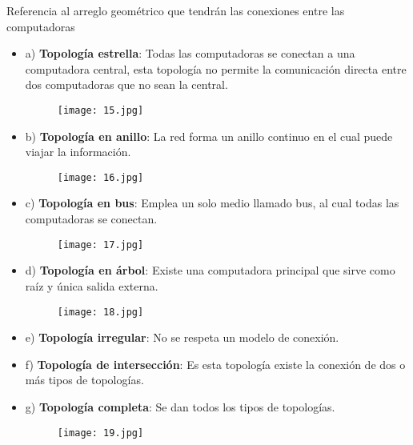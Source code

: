 Referencia al arreglo geométrico que tendrán las conexiones entre las computadoras
\begin{itemize}
		\item a) \textbf{Topología estrella}: Todas las computadoras se conectan a una computadora central, esta topología no permite la comunicación directa entre dos computadoras que no sean la central.

		\begin{figure}[h!]
				\centering
				{\texttt{[image: 15.jpg]}\par} \vspace{1cm}
		\end{figure}

		\item b) \textbf{Topología en anillo}: La red forma un anillo continuo en el cual puede viajar la información.
		\begin{figure}[h!]
				\centering
				{\texttt{[image: 16.jpg]}\par} \vspace{1cm}
		\end{figure}

		\item c) \textbf{Topología en bus}: Emplea un solo medio llamado bus, al cual todas las computadoras se conectan.
		\begin{figure}[h!]
				\centering
				{\texttt{[image: 17.jpg]}\par} \vspace{1cm}
		\end{figure}

		\item d) \textbf{Topología en árbol}: Existe una computadora principal que sirve como raíz y única salida externa.
		\begin{figure}[h!]
				\centering
				{\texttt{[image: 18.jpg]}\par} \vspace{1cm}
		\end{figure}

		\item e) \textbf{Topología irregular}: No se respeta un modelo de conexión.

		\item f) \textbf{Topología de intersección}: Es esta topología existe la conexión de dos o más tipos de topologías.

		\item g) \textbf{Topología completa}: Se dan todos los tipos de topologías.
		\begin{figure}[h!]
		\centering
		{\texttt{[image: 19.jpg]}\par} \vspace{1cm}
	\end{figure}
\end{itemize}

